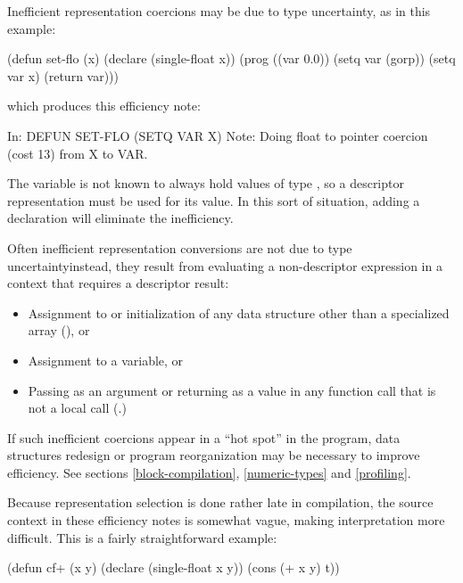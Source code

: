 Inefficient representation coercions may be due to type uncertainty,
as in this example:

\begin{lisp}
(defun set-flo (x)
  (declare (single-float x))
  (prog ((var 0.0))
    (setq var (gorp))
    (setq var x)
    (return var)))
\end{lisp}

which produces this efficiency note:

\begin{example}
In: DEFUN SET-FLO
  (SETQ VAR X)
Note: Doing float to pointer coercion (cost 13) from X to VAR.
\end{example}

The variable  is not known to always hold values of type
, so a descriptor representation must be used for its value.
In this sort of situation, adding a declaration will eliminate the inefficiency.

Often inefficient representation conversions are not due to type
uncertainty\dash{}instead, they result from evaluating a
non-descriptor expression in a context that requires a descriptor
result:

\begin{itemize} 
\item Assignment to or initialization of any data structure other than
  a specialized array (), or
  
\item Assignment to a  variable, or
  
\item Passing as an argument or returning as a value in any function
  call that is not a local call (.)
\end{itemize}

If such inefficient coercions appear in a ``hot spot'' in the program, data
structures redesign or program reorganization may be necessary to improve
efficiency.  See sections \ref{block-compilation}, \ref{numeric-types} and
\ref{profiling}.

Because representation selection is done rather late in compilation,
the source context in these efficiency notes is somewhat vague, making
interpretation more difficult.  This is a fairly straightforward
example:

\begin{lisp}
(defun cf+ (x y)
  (declare (single-float x y))
  (cons (+ x y) t))
\end{lisp}

